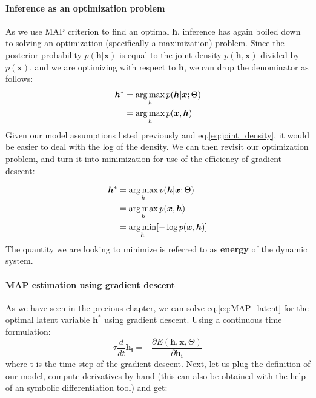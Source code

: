 \documentclass[main]{subfiles}
\begin{document}
\paragraph{Inference as an optimization problem}
As we use MAP criterion to find an optimal $\bm{h}$, inference has again boiled down to solving an optimization (specifically a maximization) problem. Since the posterior probability $p(\bm{h}|\bm{x})$ is equal to the joint density $p(\bm{h},\bm{x})$ divided by $p(\bm{x})$, and we are optimizing with respect to $\bm{h}$, we can drop the denominator as follows:
\begin{equation}
    \begin{split}
        \bm{h}^* &= \argmax_h p(\bm{h}|\bm{x};\Theta)\\
        &= \argmax_h p(\bm{x},\bm{h})\\

    \end{split}
\end{equation}
Given our model assumptions listed previously and  eq.\ref{eq:joint_density}, it would be easier to deal with the log of the density. We can then revisit our optimization problem, and turn it into minimization for use of the efficiency of gradient descent: 

\begin{equation}
    \begin{split}
        \bm{h}^* &= \operatorname*{arg\,max}_h p(\bm{h}|\bm{x};\Theta)\\
                &= \operatorname*{arg\,max}_h p(\bm{x},\bm{h})\\
                &= \operatorname*{arg\,min}_h [-\log p(\bm{x},\bm{h})]\\
    \end{split}
    \label{eq:MAP_latent}
\end{equation}
The quantity we are looking to minimize is referred to as \textbf{energy} of the dynamic system.

\paragraph{MAP estimation using gradient descent}
As we have seen in the precious chapter, we can solve eq.\ref{eq:MAP_latent} for the optimal latent variable $\bm{h}^*$ using gradient descent. Using a continuous time formulation:
\begin{equation}
    \tau \frac{d}{dt}\bm{h_i} = - \frac{\partial E(\bm{h},\bm{x},\Theta)}{\partial \bm{h_i}}
\end{equation}
where t is the time step of the gradient descent.
Next, let us plug the definition of our model, compute derivatives by hand (this can also be obtained with the help of an symbolic differentiation tool) and get:
\end{document}
